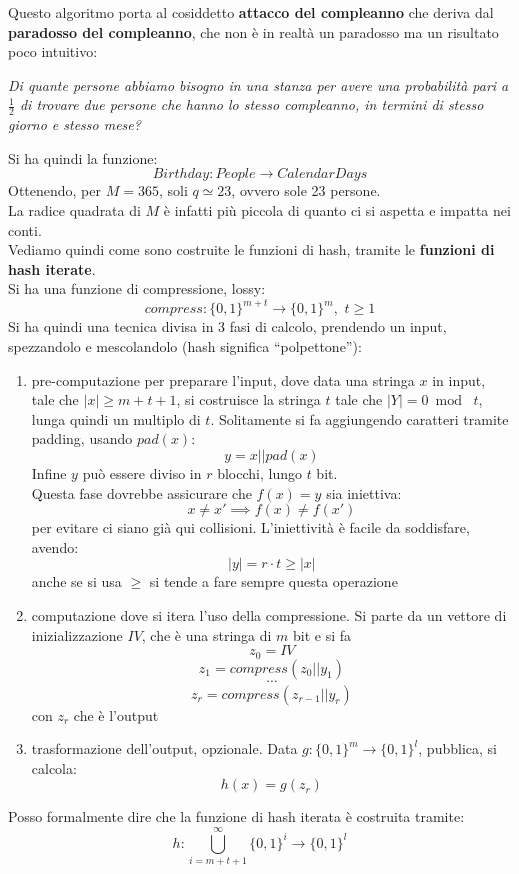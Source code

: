 \documentclass[a4paper,12pt, oneside]{book}
\begin{document}
Questo algoritmo porta al cosiddetto \textbf{attacco del compleanno} che deriva
dal \textbf{paradosso del compleanno}, che non è in realtà un paradosso ma un
risultato poco intuitivo:
\begin{center}
  \textit{Di quante persone abbiamo bisogno in una stanza per avere una
    probabilità pari a $\frac{1}{2}$ di trovare due persone che hanno lo stesso
    compleanno, in termini di stesso giorno e stesso mese?} 
\end{center}
Si ha quindi la funzione:
\[Birthday:People\to CalendarDays\]
Ottenendo, per $M=365$, soli $q\simeq 23$, ovvero sole 23 persone.\\
La radice quadrata di $M$ è infatti più piccola di quanto ci si aspetta e
impatta nei conti.\\
Vediamo quindi come sono costruite le funzioni di hash, tramite le
\textbf{funzioni di hash iterate}.\\
Si ha una funzione di compressione, lossy:
\[compress:\{0,1\}^{m+t}\to\{0,1\}^{m},\,\,t\geq 1\]
Si ha quindi una tecnica divisa in 3 fasi di calcolo, prendendo un input,
spezzandolo e mescolandolo (hash significa ``polpettone''):
\begin{enumerate}
  \item pre-computazione per preparare l'input, dove data una stringa $x$ in
  input, tale che $|x|\geq m+t+1$, si costruisce la stringa $t$ tale che
  $|Y|=0\bmod \,\,t$, lunga quindi un multiplo di $t$. Solitamente si fa
  aggiungendo caratteri tramite padding, usando $pad(x)$:
  \[y=x||pad(x)\]
  Infine $y$ può essere diviso in $r$ blocchi, lungo $t$ bit.\\
  Questa fase dovrebbe assicurare che $f(x)=y$ sia iniettiva:
  \[x\neq x'\implies f(x)\neq f(x')\]
  per evitare ci siano già qui collisioni. L'iniettività è facile da soddisfare,
  avendo:
  \[|y|=r\cdot t\geq |x|\]
  anche se si usa $\geq$ si tende a fare sempre questa operazione
  \item computazione dove si itera l'uso della compressione. Si parte da un
  vettore di inizializzazione $IV$, che è una stringa di $m$ bit e si fa
  \[z_0=IV\]
  \[z_1=compress(z_0||y_1)\]
  \[\cdots\]
  \[z_r=compress(z_{r-1}||y_r) \]
  con $z_r$ che è l'output
  \item trasformazione dell'output, opzionale. Data $g:\{0,1\}^m\to\{0,1\}^l$,
  pubblica, si calcola:
  \[h(x)=g(z_r)\]
\end{enumerate}
Posso formalmente dire che la funzione di hash iterata è costruita tramite:
\[h:\bigcup_{i=m+t+1}^\infty\{0,1\}^i\to\{0,1\}^l\]
\end{document}
